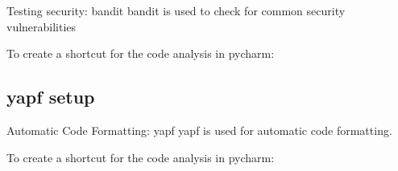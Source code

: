 Testing security: bandit
bandit is used to check for common security vulnerabilities

To create a shortcut for the code analysis in pycharm:




\subsection{yapf setup}
Automatic Code Formatting: yapf
yapf is used for automatic code formatting.

To create a shortcut for the code analysis in pycharm:

